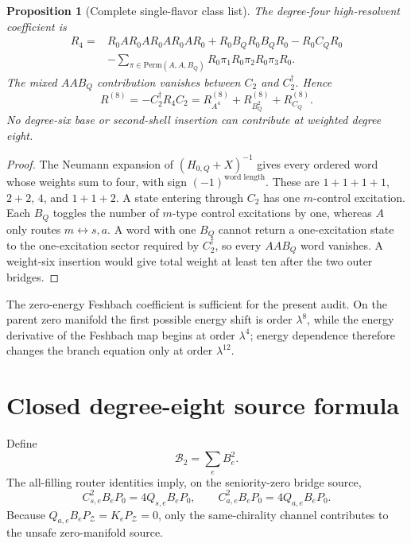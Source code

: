 \documentclass[11pt]{article}
\newtheorem{proposition}[theorem]{Proposition}
\theoremstyle{definition}
\theoremstyle{remark}
\newcommand{\cZ}{\mathcal Z}
\newcommand{\cB}{\mathcal B}
\begin{document}
\begin{proposition}[Complete single-flavor class list]
\label{prop:class-list}
The degree-four high-resolvent coefficient is
\begin{align}
 R_4={}&R_0AR_0AR_0AR_0AR_0
 +R_0B_QR_0B_QR_0-R_0C_QR_0
 \nonumber\\
 &-\sum_{\pi\in\mathrm{Perm}(A,A,B_Q)}
 R_0\pi_1R_0\pi_2R_0\pi_3R_0.
 \label{eq:R4}
\end{align}
The mixed $AAB_Q$ contribution vanishes between $C_2$ and $C_2^\dagger$.  Hence
\begin{equation}
 R^{(8)}=-C_2^\dagger R_4C_2
 =R_{A^4}^{(8)}+R_{B_Q^2}^{(8)}+R_{C_Q}^{(8)}.
 \label{eq:R8classes}
\end{equation}
No degree-six base or second-shell insertion can contribute at weighted degree eight.
\end{proposition}

\begin{proof}
The Neumann expansion of $(H_{0,Q}+X)^{-1}$ gives every ordered word whose weights sum to four, with sign $(-1)^{\text{word length}}$.  These are $1+1+1+1$, $2+2$, $4$, and $1+1+2$.  A state entering through $C_2$ has one $m$-control excitation.  Each $B_Q$ toggles the number of $m$-type control excitations by one, whereas $A$ only routes $m\leftrightarrow s,a$.  A word with one $B_Q$ cannot return a one-excitation state to the one-excitation sector required by $C_2^\dagger$, so every $AAB_Q$ word vanishes.  A weight-six insertion would give total weight at least ten after the two outer bridges.
\end{proof}

The zero-energy Feshbach coefficient is sufficient for the present audit.  On the parent zero manifold the first possible energy shift is order $\lambda^8$, while the energy derivative of the Feshbach map begins at order $\lambda^4$; energy dependence therefore changes the branch equation only at order $\lambda^{12}$.

\section{Closed degree-eight source formula}\label{sec:source}

Define
\begin{equation}
 \cB_2=\sum_eB_e^2.
 \label{eq:B2sum}
\end{equation}
The all-filling router identities imply, on the seniority-zero bridge source,
\begin{equation}
 C_{s,e}^2B_eP_0=4Q_{s,e}B_eP_0,
 \qquad
 C_{a,e}^2B_eP_0=4Q_{a,e}B_eP_0.
 \label{eq:router}
\end{equation}
Because $Q_{a,e}B_eP_{\cZ}=K_eP_{\cZ}=0$, only the same-chirality channel contributes to the unsafe zero-manifold source.
\end{document}
